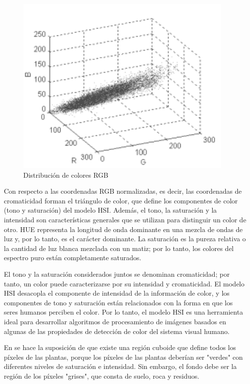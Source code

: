 \documentclass[conference,compsoc]{IEEEtran}
\begin{document}
\begin{figure}[H]
\centering
\includegraphics[scale=0.5]{cigarro.png}
\caption{\label{fig:cigarro}Distribución de colores RGB}
\end{figure}

Con respecto a las coordenadas RGB normalizadas, es decir, las coordenadas de cromaticidad forman el triángulo de color, que define los componentes de color (tono y saturación) del modelo HSI. Además, el tono, la saturación y la intensidad son características generales que se utilizan para distinguir un color de otro. HUE representa la longitud de onda dominante en una mezcla de ondas de luz y, por lo tanto, es el carácter dominante. La saturación es la pureza relativa o la cantidad de luz blanca mezclada con un matiz; por lo tanto, los colores del espectro puro están completamente saturados.

El tono y la saturación considerados juntos se denominan cromaticidad; por tanto, un color puede caracterizarse por su intensidad y cromaticidad. El modelo HSI desacopla el componente de intensidad de la información de color, y los componentes de tono y saturación están relacionados con la forma en que los seres humanos perciben el color. Por lo tanto, el modelo HSI es una herramienta ideal para desarrollar algoritmos de procesamiento de imágenes basados en algunas de las propiedades de detección de color del sistema visual humano.

En \cite{algen} se hace la suposición de que existe una región cuboide que define todos los píxeles de las plantas, porque los píxeles de las plantas deberían ser "verdes" con diferentes niveles de saturación e intensidad. Sin embargo, el fondo debe ser la región de los píxeles "grises", que consta de suelo, roca y residuos.
\end{document}
